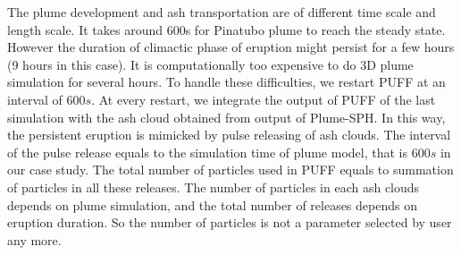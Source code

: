 The plume development and ash transportation are of different time scale and length scale.
It takes around 600s for Pinatubo plume to reach the steady state. However the duration of climactic phase of eruption might persist for a few hours (9 hours in this case). It is computationally too expensive to do 3D plume simulation for several hours. To handle these difficulties, we restart PUFF at an interval of $600 s$. At every restart, we integrate the output of PUFF of the last simulation with the ash cloud obtained from output of Plume-SPH. In this way, the persistent eruption is mimicked by pulse releasing of ash clouds. The interval of the pulse release equals to the simulation time of plume model, that is $600 s$ in our case study. The total number of particles used in PUFF equals to summation of particles in all these releases. The number of particles in each ash clouds depends on plume simulation, and the total number of releases depends on eruption duration. So the number of particles is not a parameter selected by user any more.

